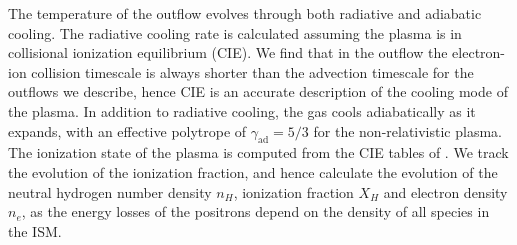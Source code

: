\documentclass[a4paper,fleqn,usenatbib]{mnras}
\begin{document}
The temperature of the outflow evolves through both radiative and adiabatic cooling. The radiative cooling rate is calculated assuming the plasma is in collisional ionization equilibrium (CIE). We find that in the outflow the electron-ion collision timescale \citep[e.g.][]{Lacki2014} is always shorter than the advection timescale for the outflows we describe, hence CIE is an accurate description of the cooling mode of the plasma. In addition to radiative cooling, the gas cools adiabatically as it expands, with an effective polytrope of $\gamma_\mathrm{ad} = 5/3$ for the non-relativistic plasma.\\
The ionization state of the plasma is computed from the CIE tables of \cite{MAPPINGS}. We track the evolution of the ionization fraction, and hence calculate the evolution of the neutral hydrogen number density $n_H$, ionization fraction $X_H$ and electron density $n_e$, as the energy losses of the positrons depend on the density of all species in the ISM. 
\end{document}
